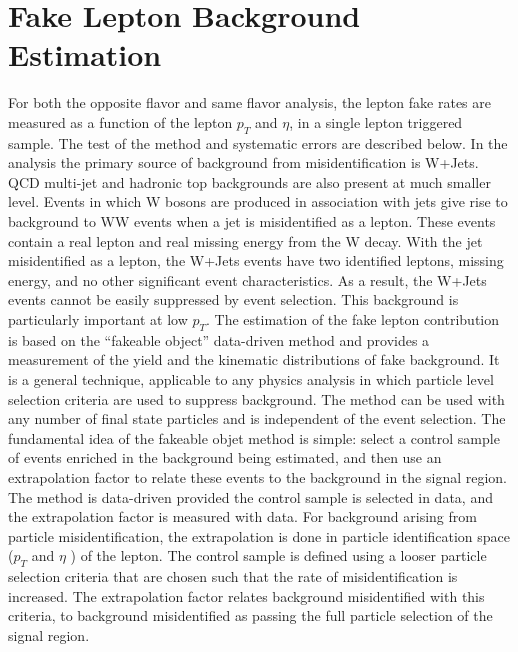 \newpage


\section{Fake Lepton Background Estimation}
\label{fk}
For both the opposite flavor and same flavor analysis, the lepton fake rates are measured as a
function of the lepton $p_T$ and $\eta$, in a single lepton triggered sample. The test of the method and
systematic errors are described below.
\newline
In the analysis
the primary source of background from misidentification is W+Jets. QCD multi-jet and hadronic top backgrounds
are also present at much smaller level. Events in which W bosons are produced in association
with jets give rise to background to WW events when a jet is misidentified as a lepton. These
events contain a real lepton and real missing energy from the W decay. With the jet misidentified 
as a lepton, the W+Jets events have two identified leptons, missing energy, and no other
significant event characteristics. As a result, the W+Jets events cannot be easily suppressed
by event selection. This background is particularly important at low $p_T$.
The estimation of the fake lepton contribution is based on the ``fakeable object'' data-driven
method and provides a measurement of the yield and the kinematic distributions of fake background. 
It is a general technique, applicable to any physics analysis in which particle level
selection criteria are used to suppress background. The method can be used with any number
of final state particles and is independent of the event selection.
The fundamental idea of the fakeable objet method is simple: select a control sample of events
enriched in the background being estimated, and then use an extrapolation factor to relate these
events to the background in the signal region. The method is data-driven provided the control
sample is selected in data, and the extrapolation factor is measured with data. For background
arising from particle misidentification, the extrapolation is done in particle identification space
($p_T$ and $\eta$ ) of the lepton. The control sample is defined using a looser particle selection criteria
that are chosen such that the rate of misidentification is increased. The extrapolation factor
relates background misidentified with this criteria, to background misidentified as passing the
full particle selection of the signal region.



